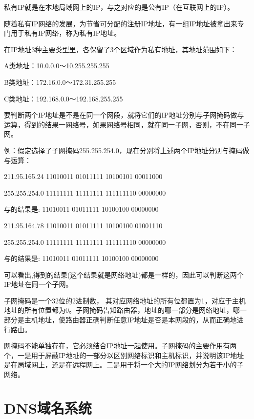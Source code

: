 {\bfseries {}}

私有IP就是在本地局域网上的IP，与之对应的是公有IP（在互联网上的IP）。

随着私有IP网络的发展，为节省可分配的注册IP地址，有一组IP地址被拿出来专门用于私有IP网络，称为私有IP地址。

在IP地址3种主要类型里，各保留了3个区域作为私有地址，其地址范围如下： 

A类地址：10.0.0.0～10.255.255.255 

B类地址：172.16.0.0～172.31.255.255 

C类地址：192.168.0.0～192.168.255.255

{\bfseries {}}

要判断两个IP地址是不是在同一个网段，就将它们的IP地址分别与子网掩码做与运算，得到的结果一网络号，如果网络号相同，就在同一子网，否则，不在同一子网。

例：假定选择了子网掩码255.255.254.0，现在分别将上述两个IP地址分别与掩码做与运算：

\begin{framed}
    211.95.165.24 11010011 01011111 10100101 00011000

    255.255.254.0 11111111 11111111 111111110 00000000

    与的结果是: 11010011 01011111 10100100 00000000

    211.95.164.78 11010011 01011111 10100100 01001110

    255.255.254.0 11111111 11111111 111111110 00000000

    与的结果是: 11010011 01011111 10100100 00000000
\end{framed}

可以看出,得到的结果(这个结果就是网络地址)都是一样的，因此可以判断这两个IP地址在同一个子网。

{\bfseries {}}

子网掩码是一个32位的2进制数， 其对应网络地址的所有位都置为1，对应于主机地址的所有位置都为0。子网掩码告知路由器，地址的哪一部分是网络地址，哪一部分是主机地址，使路由器正确判断任意IP地址是否是本网段的，从而正确地进行路由。

网掩码不能单独存在，它必须结合IP地址一起使用。子网掩码的主要作用有两个，一是用于屏蔽IP地址的一部分以区别网络标识和主机标识，并说明该IP地址是在局域网上，还是在远程网上。二是用于将一个大的IP网络划分为若干小的子网络。

\section{DNS域名系统}


